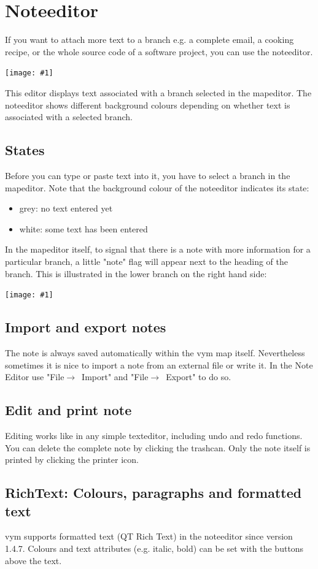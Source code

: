 \documentclass[12pt,a4paper]{article}
\newcommand{\maximage}[1]{  
    \begin{center}
        \texttt{[image: \#1]} 
    \end{center}
}
\newcommand{\vym}{{\sc vym }}
\newcommand{\ra}{$\longrightarrow$}
\newcommand{\key}[1]{[#1]}
\begin{document}

\section{Noteeditor} \label {noteeditor}
If you want to attach more text to a branch e.g. a complete email, a
cooking recipe, or the whole source code of a software project, you can
use the noteeditor. 
    \maximage{images/noteeditor.png}
This editor displays text associated with a branch selected in the
mapeditor. The noteeditor shows different background colours depending
on whether text is associated with a selected branch.

\subsection{States}
Before you can type or paste text into it, you have
to select a branch in the mapeditor. Note that the background colour
of the noteeditor indicates its state:
\begin{itemize}
    \item grey: no text entered yet
    \item white: some text has been entered
\end{itemize}   
In the mapeditor itself, to signal that there is a note with more
information for a particular branch, a little "note" flag will appear
next to the heading of the branch. This is illustrated in the lower
branch on the right hand side: 
\maximage{images/branches-flags.png}

\subsection{Import and export notes}
The note is always saved automatically within the \vym map itself.
Nevertheless sometimes it is nice to import a note from an external file
or write it. In the Note Editor use "File\ra~Import" and
"File\ra~Export" to do so. 

\subsection{Edit and print note}
Editing works like in any simple texteditor, including undo and redo
functions. You can delete the complete note by clicking the trashcan.
Only the note itself is printed by clicking the printer icon.

\subsection{RichText: Colours, paragraphs and formatted text}
\vym supports formatted text (QT Rich Text) in the noteeditor since
version 1.4.7.  Colours and text attributes (e.g. italic, bold) can be
set with the buttons above the text.  
\end{document}

